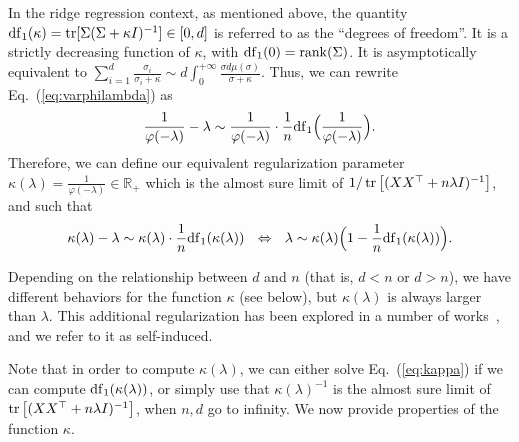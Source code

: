 \documentclass[11pt]{article}
\newcommand{\BEQ}{\begin{equation}}
\newcommand{\EEQ}{\end{equation}}
\newcommand{\tr}{\mathop{ \rm tr}}
\newcommand{\idm}{I}
\newcommand{\rb}{\mathbb{R}}
\newcommand{\eq}[1]{Eq.~(\ref{eq:#1})}
\def \S{  { \Sigma} }
\begin{document}
 
In the ridge regression context, as mentioned above, the quantity ${\rm df}_1(\kappa) = \tr [ \S (\S + \kappa \idm)^{-1} ] \in [0,d]$ is referred to as the ``degrees of freedom''. It is a strictly decreasing function of $\kappa$, with ${\rm df}_{1}(0) = {\rm rank}(\S)$.  It is asymptotically equivalent to $  \sum_{i=1}^d \frac{\sigma_i}{\sigma_i + \kappa}
\sim d \int_0^{+\infty} \frac{\sigma d\mu  (\sigma)}{\sigma + \kappa}$. Thus, we can rewrite \eq{varphilambda} as
$$
\frac{1}{\varphi(-\lambda)} - \lambda \sim \frac{1}{\varphi(-\lambda)}  \cdot \frac{1}{n}  {\rm df}_1\Big(\frac{1}{\varphi(-\lambda)} \Big) .$$
Therefore, we can define our equivalent regularization parameter $\kappa(\lambda)=\frac{1}{\varphi(-\lambda)} \in \rb_+$
 which is the almost sure limit of 
$ 1 / \tr \big[ (XX ^\top + n \lambda \idm)^{-1} \big] $, and  such that
\BEQ
\label{eq:kappa}
\kappa(\lambda) - \lambda \sim \kappa(\lambda)  \cdot \frac{1}{n}  {\rm df}_1(\kappa(\lambda) ) 
\ \ \Leftrightarrow \  \ \lambda \sim \kappa(\lambda) \Big( 1 - \frac{1}{n}  {\rm df}_1(\kappa(\lambda) )  \Big). 
\EEQ

Depending on the relationship between $d$ and $n$ (that is, $d<n$ or $d>n$), we have different behaviors for the function $\kappa$ (see below), but $\kappa(\lambda)$ is always larger than $\lambda$.
This additional regularization has been explored in a number of works~\cite{lejeune2022asymptotics,jacot2020implicit,cheng2022dimension}, and we refer to it as self-induced.

Note that in order to compute $\kappa(\lambda)$, we can either solve \eq{kappa} if we can compute $ {\rm df}_1(\kappa(\lambda))$, or simply use that $\kappa(\lambda)^{-1}$ is the almost sure limit of 
$ \tr \big[ (XX ^\top + n \lambda \idm)^{-1} \big]$, when $n,d$ go to infinity. We now provide properties of the function $\kappa$.
 
\end{document}
